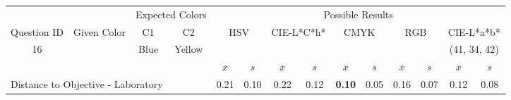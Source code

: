 \begin{table}[H]
  \resizebox{\textwidth}{!} {
  \begin{tabular}{lccccccccccccc}
    \hline
    \multicolumn{1}{c}{}                              &                                      & \multicolumn{2}{c}{Expected Colors}                   & \multicolumn{10}{c}{Possible Results}                                                                                                                                                                                                                                                                                        \\ \cline{3-14}
    \multicolumn{1}{c}{\multirow{-2}{*}{Question ID}} & \multirow{-2}{*}{Given Color}        & C1                       & C2                         & \multicolumn{2}{c}{HSV}                                        & \multicolumn{2}{c}{CIE-L*C*h*}                                 & \multicolumn{2}{c}{CMYK}                                       & \multicolumn{2}{c}{RGB}                                        & \multicolumn{2}{c}{CIE-L*a*b*}                                 \\ \hline
    \multicolumn{1}{c}{16}                             & \cellcolor[HTML]{FF007F}{\color[HTML]{FFFFFF}(45, 23, 22)} & \multicolumn{1}{c|}{Blue} & \multicolumn{1}{c|}{Yellow}  & \multicolumn{2}{c|}{\cellcolor[HTML]{FF007F}{\color[HTML]{FFFFFF}(45, 23, 22)}}      & \multicolumn{2}{c|}{\cellcolor[HTML]{FF0050}{\color[HTML]{FFFFFF}(43, 22, 10)}}       & \multicolumn{2}{c|}{\cellcolor[HTML]{808080}{\color[HTML]{FFFFFF}(21, 22, 24)}}       & \multicolumn{2}{c|}{\cellcolor[HTML]{808080}{\color[HTML]{FFFFFF}(21, 22, 24)}}       & \multicolumn{2}{c|}{\cellcolor[HTML]{CA8AAA}(41, 34, 42)}       \\ \hline
                                                      & \multicolumn{1}{l}{}                 & \multicolumn{1}{l}{}     & \multicolumn{1}{l}{}       & \multicolumn{1}{c}{$\overline{x}$} & \multicolumn{1}{c}{$s$} & \multicolumn{1}{c}{$\overline{x}$} & \multicolumn{1}{c}{$s$} & \multicolumn{1}{c}{$\overline{x}$} & \multicolumn{1}{c}{$s$} & \multicolumn{1}{c}{$\overline{x}$} & \multicolumn{1}{c}{$s$} & \multicolumn{1}{c}{$\overline{x}$} & \multicolumn{1}{c}{$s$} \\ \hline
    \multicolumn{4}{l}{Distance to Objective - Laboratory}                                                                                           & \multicolumn{1}{|c}{0.21}       & \multicolumn{1}{c|}{0.10}    & \multicolumn{1}{|c}{0.22}       & \multicolumn{1}{c|}{0.12}    & \multicolumn{1}{|c}{\textbf{0.10}}       & \multicolumn{1}{c|}{0.05}    & \multicolumn{1}{|c}{0.16}       & \multicolumn{1}{c|}{0.07}    & \multicolumn{1}{|c}{0.12}       & \multicolumn{1}{c|}{0.08}    \\

\end{tabular}}
\end{table}
